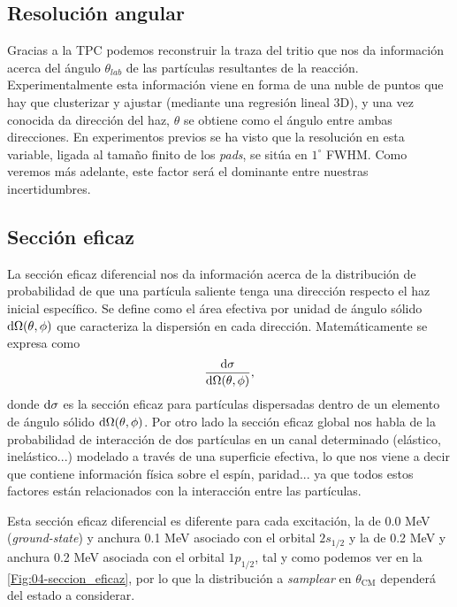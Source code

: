 \subsection{Resolución angular}

Gracias a la TPC podemos reconstruir la traza del tritio que nos da información acerca del ángulo $\theta_{lab}$ de las partículas resultantes de la reacción. Experimentalmente esta información viene en forma de una nuble de puntos que hay que clusterizar y ajustar (mediante una regresión lineal 3D), y una vez conocida da dirección del haz, $\theta$ se obtiene como el ángulo entre ambas direcciones. En experimentos previos \cite{MAUSS2019498} se ha visto que la resolución en esta variable, ligada al tamaño finito de los \textit{pads}, se sitúa en $1^{\circ}$ FWHM. Como veremos más adelante, este factor será el dominante entre nuestras incertidumbres.


\subsection{Sección eficaz}

La sección eficaz diferencial nos da información acerca de la distribución de probabilidad de que una partícula saliente tenga una dirección respecto el haz inicial específico. Se define como el área efectiva por unidad de ángulo sólido $\mathrm{d}\Omega(\theta,\phi)$ que caracteriza la dispersión en cada dirección. Matemáticamente se expresa como
\begin{equation}
\frac{\mathrm{d}\sigma}{\mathrm{d}\Omega(\theta,\phi)},
\end{equation}
donde $\mathrm{d}\sigma$ es la sección eficaz para partículas dispersadas dentro de un elemento de ángulo sólido $\mathrm{d}\Omega(\theta,\phi)$. Por otro lado la sección eficaz global nos habla de la probabilidad de interacción de dos partículas en un canal determinado (elástico, inelástico...) modelado a través de una superficie efectiva, lo que nos viene a decir que contiene información física sobre el espín, paridad... ya que todos estos factores están relacionados con la interacción entre las partículas.

Esta sección eficaz diferencial es diferente para cada excitación, la de 0.0 MeV (\textit{ground-state}) y anchura 0.1 MeV asociado con el orbital $2s_{1/2}$ y la de 0.2 MeV y anchura 0.2 MeV asociada con el orbital $1p_{1/2}$, tal y como podemos ver en la \cref{Fig:04-seccion_eficaz}, por lo que la distribución a \textit{samplear} en $\theta_{\text{CM}}$ dependerá del estado a considerar. 

